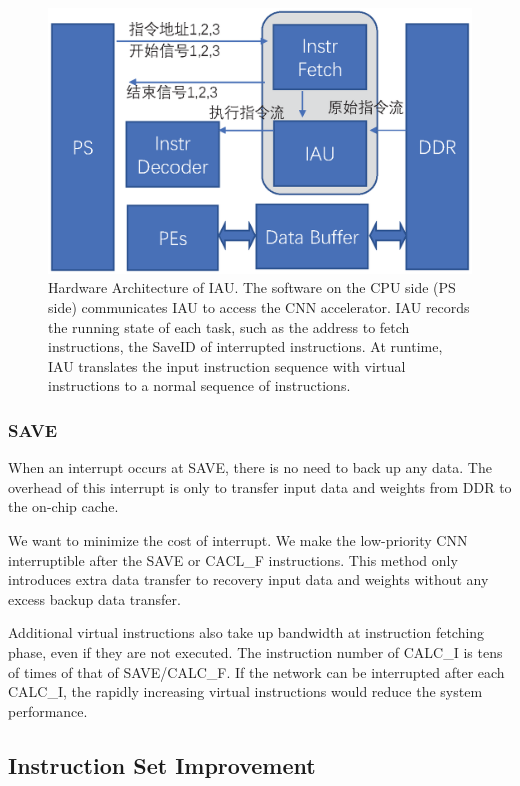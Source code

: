 \begin{figure}[t]
	\centering
	\includegraphics[width=0.99\linewidth]{fig/IAU.eps}
	\caption{Hardware Architecture of IAU. The software on the CPU side (PS side) communicates IAU to access the CNN accelerator. IAU records the running state of each task, such as the address to fetch instructions, the SaveID of interrupted instructions. At runtime, IAU translates the input instruction sequence with virtual instructions to a normal sequence of instructions. }
	\label{fig:IAU}
\end{figure}

\subsubsection{SAVE}
When an interrupt occurs at SAVE, there is no need to back up any data. The overhead of this interrupt is only to transfer input data and weights from DDR to the on-chip cache.

We want to minimize the cost of interrupt. We make the low-priority CNN interruptible after the SAVE or CACL\_F instructions. This method only introduces extra data transfer to recovery input data and weights without any excess backup data transfer.

Additional virtual instructions also take up bandwidth at instruction fetching phase, even if they are not executed. The instruction number of CALC\_I is tens of times of that of SAVE/CALC\_F. If the network can be interrupted after each CALC\_I, the rapidly increasing virtual instructions would reduce the system performance.

\subsection{ Instruction Set Improvement }
\label{sec:virtualinstr}

